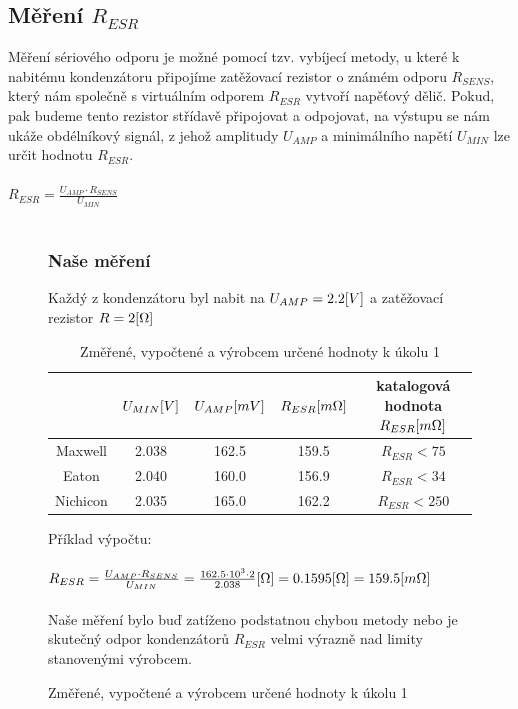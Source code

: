\documentclass{article}
\begin{document}
\subsection*{Měření \(R_{ESR}\)}
Měření sériového odporu je možné pomocí tzv. vybíjecí metody, u které k nabitému kondenzátoru připojíme zatěžovací rezistor o známém odporu \(R_{SENS}\), který nám společně s virtuálním odporem \(R_{ESR}\) vytvoří napěťový dělič.
Pokud, pak budeme tento rezistor střídavě připojovat a odpojovat, na výstupu se nám ukáže obdélníkový signál, z jehož amplitudy \(U_{AMP}\) a minimálního napětí \(U_{MIN}\) lze určit hodnotu \(R_{ESR}\). 
\\ \\
\Large
\(
  R_{ESR} = \frac{U_{AMP}\cdot R_{SENS}}{U_{MIN}}
\)
\normalsize
\\ \\
\begin{figure}[H]
  \begin{minipage}[t]{\textwidth}
    \subsubsection*{Naše měření}
    Každý z kondenzátoru byl nabit na \(U_{AMP} = 2.2\-[V]\) a zatěžovací rezistor \(R = 2\-[\Omega]\)
    \begin{table}[H]
      \centering
      \begin{tabular}{|c|c|c|c||c|}
      \hline
                  &	\(U_{MIN}\-[V]\)  & \(U_{AMP}\-[mV]\)  & \(R_{ESR}\-[m\Omega]\) & katalogová hodnota \(R_{ESR}\-[m\Omega]\)  \\ \hline
        Maxwell   & 2.038             & 162.5              & 159.5                  & \(R_{ESR} <  75\)                          \\ \hline
        Eaton     & 2.040             & 160.0              & 156.9                  & \(R_{ESR} <  34\)                          \\ \hline
        Nichicon  & 2.035             & 165.0              & 162.2                  & \(R_{ESR} < 250\)                          \\ \hline
      \end{tabular}
      \caption{\label{ESR} Změřené, vypočtené a výrobcem určené hodnoty k úkolu 1}
    \end{table}
    \vspace{-5mm}
    Příklad výpočtu:
    \\ \\
    \Large
    \(
      R_{ESR} = \frac{U_{AMP}\cdot R_{SENS}}{U_{MIN}} = \frac{162.5\cdot10^{3}\cdot 2}{2.038}\-[\Omega] = 0.1595\-[\Omega] = 159.5\-[m\Omega]
    \)
    \normalsize
    \\ \\
    Naše měření bylo buď zatíženo podstatnou chybou metody nebo je skutečný odpor kondenzátorů \(R_{ESR}\) velmi výrazně nad limity stanovenými výrobcem. 
  \end{minipage}
\end{figure}
\end{document}
